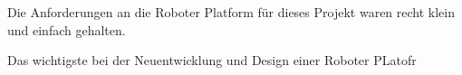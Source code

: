 \begin{flushleft}
    Die Anforderungen an die Roboter Platform für dieses Projekt waren recht klein und einfach gehalten.
     
    Das wichtigste bei der Neuentwicklung und Design einer Roboter PLatofr
\end{flushleft}